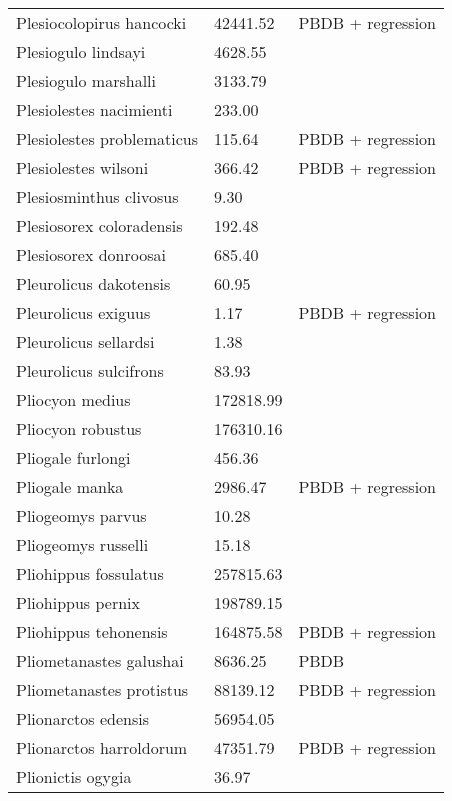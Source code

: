 \documentclass{article}
\begin{document}
\begin{center}
\begin{longtable}{p{} p{} p{}}
    Plesiocolopirus hancocki & 42441.52 & PBDB + regression \\ 
    Plesiogulo lindsayi & 4628.55 & \cite{Tomiya2013} \\ 
    Plesiogulo marshalli & 3133.79 & \cite{Tomiya2013} \\ 
    Plesiolestes nacimienti & 233.00 & \cite{Soligo2006} \\ 
    Plesiolestes problematicus & 115.64 & PBDB + regression \\ 
    Plesiolestes wilsoni & 366.42 & PBDB + regression \\ 
    Plesiosminthus clivosus & 9.30 & \cite{Tomiya2013} \\ 
    Plesiosorex coloradensis & 192.48 & \cite{Tomiya2013} \\ 
    Plesiosorex donroosai & 685.40 & \cite{Tomiya2013} \\ 
    Pleurolicus dakotensis & 60.95 & \cite{Tomiya2013} \\ 
    Pleurolicus exiguus & 1.17 & PBDB + regression \\ 
    Pleurolicus sellardsi & 1.38 & \cite{Zakrzewski1991a} \\ 
    Pleurolicus sulcifrons & 83.93 & \cite{Tomiya2013} \\ 
    Pliocyon medius & 172818.99 & \cite{Tomiya2013} \\ 
    Pliocyon robustus & 176310.16 & \cite{Tomiya2013} \\ 
    Pliogale furlongi & 456.36 & \cite{Wood1962} \\ 
    Pliogale manka & 2986.47 & PBDB + regression \\ 
    Pliogeomys parvus & 10.28 & \cite{Tomiya2013} \\ 
    Pliogeomys russelli & 15.18 & \cite{Tomiya2013} \\ 
    Pliohippus fossulatus & 257815.63 & \cite{Tomiya2013} \\ 
    Pliohippus pernix & 198789.15 & \cite{Tomiya2013} \\ 
    Pliohippus tehonensis & 164875.58 & PBDB + regression \\ 
    Pliometanastes galushai & 8636.25 & PBDB \\ 
    Pliometanastes protistus & 88139.12 & PBDB + regression \\ 
    Plionarctos edensis & 56954.05 & \cite{Tomiya2013} \\ 
    Plionarctos harroldorum & 47351.79 & PBDB + regression \\ 
    Plionictis ogygia & 36.97 & \cite{Tomiya2013} \\ 

\end{longtable}
\end{center}
\end{document}
